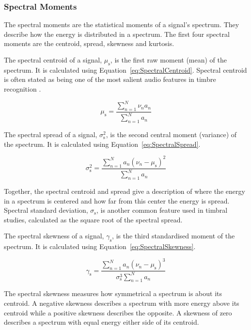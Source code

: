 		\subsubsection*{Spectral Moments}
			The spectral moments are the statistical moments of a signal's spectrum. They describe how the
			energy is distributed in a spectrum. The first four spectral moments are the centroid, spread,
			skewness and kurtosis.

			The spectral centroid of a signal, $\mu_{\mathrm{s}}$, is the first raw moment (mean) of the
			spectrum. It is calculated using Equation~\ref{eq:SpectralCentroid}. Spectral centroid is often
			stated as being one of the most salient audio features in timbre recognition
			\citep{freed1990auditory, lakatos2000a}. 

			\begin{equation}
				\mu_{\mathrm{s}} = \frac{\sum_{n = 1}^{N} \nu_{n}a_{n}}
					   	   {\sum_{n = 1}^{N} a_{n}}
				\label{eq:SpectralCentroid}
			\end{equation}

			The spectral spread of a signal, $\sigma_{\mathrm{s}}^{2}$, is the second central moment (variance)
			of the spectrum. It is calculated using Equation~\ref{eq:SpectralSpread}.

			\begin{equation}
				\sigma_{\mathrm{s}}^{2} = \frac{\sum_{n = 1}^{N} a_{n}(\nu_{n} - \mu_{\mathrm{s}})^{2}}
						  	  {\sum_{n = 1}^{N} a_{n}}
				\label{eq:SpectralSpread}
			\end{equation}

			Together, the spectral centroid and spread give a description of where the energy in a spectrum is
			centered and how far from this center the energy is spread. Spectral standard deviation,
			$\sigma_{\mathrm{s}}$, is another common feature used in timbral studies, calculated as the square
			root of the spectral spread.

			The spectral skewness of a signal, $\gamma_{\mathrm{s}}$, is the third standardised moment of the
			spectrum. It is calculated using Equation~\ref{eq:SpectralSkewness}.

			\begin{equation}
				\gamma_{\mathrm{s}} = \frac{\sum_{n = 1}^{N} a_{n}(\nu_{n} - \mu_{\mathrm{s}})^{3}}
					{\sigma_{\mathrm{s}}^{3}\sum_{n = 1}^{N} a_{n}}
				\label{eq:SpectralSkewness}
			\end{equation}

			The spectral skewness measures how symmetrical a spectrum is about its centroid. A negative
			skewness describes a spectrum with more energy above its centroid while a positive skewness
			describes the opposite. A skewness of zero describes a spectrum with equal energy either side of
			its centroid.

